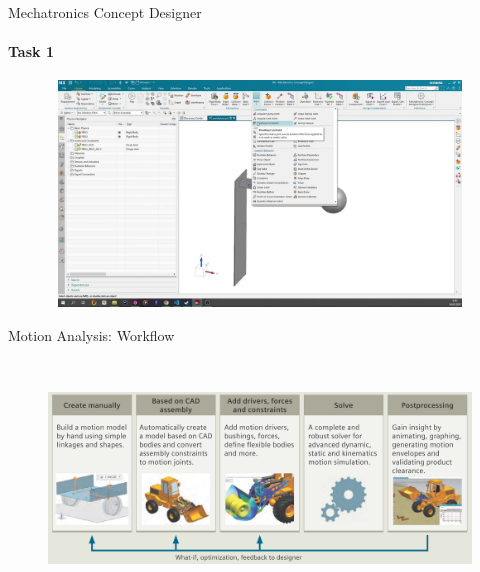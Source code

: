 \documentclass[aspectratio=169]{beamer}
\begin{document}
\begin{frame}[t]{Mechatronics Concept Designer}
    \framesubtitle{Task 1}
    \vspace{-0.6cm}
    \begin{figure}[H]
        \href{https://disk.yandex.ru/i/F-FYIX3xmzNACg}{
            \centering\includegraphics[height=6cm,width=1\textwidth,keepaspectratio]{mcd_video_preview.png}}
        \label{fig:mcd_video_preview.png}
    \end{figure}
\end{frame}

\begin{frame}[t]{Motion Analysis: Workflow}
\framesubtitle{}
    \vspace{-0.6cm}
    \begin{figure}[H]
        \centering\includegraphics[height=6cm,width=1\textwidth,keepaspectratio]{cae_motion_guideline.png}
        \label{fig:cae_motion_guideline.png}
    \end{figure}
\end{frame}
\end{document}
